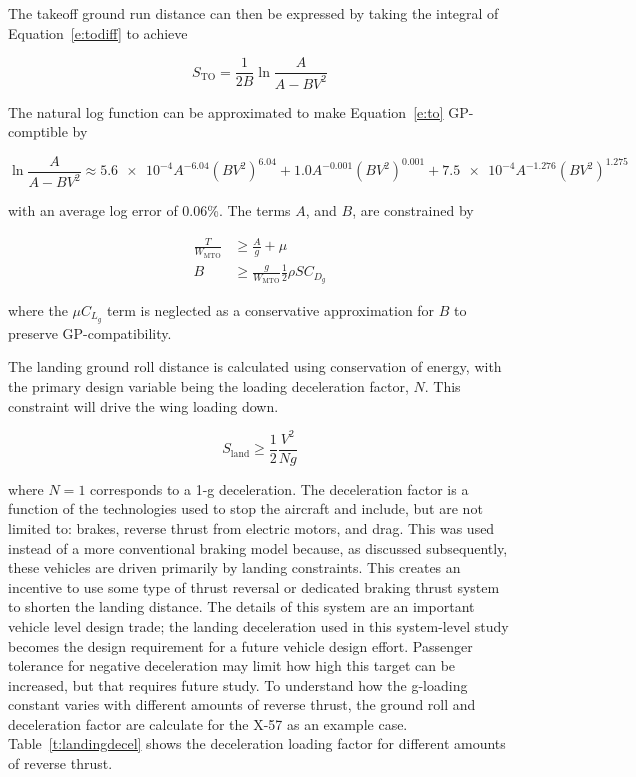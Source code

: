\documentclass[]{aiaa-tc}%
\begin{document}
The takeoff ground run distance can then be expressed by taking the integral of Equation~\ref{e:todiff} to achieve

\begin{equation}
    \label{e:to}
    S_{\mathrm{TO}} = \frac{1}{2B} \ln{\frac{A}{A-BV^2}} 
\end{equation}

The natural log function can be approximated to make Equation~\ref{e:to} GP-comptible by 

\begin{equation}
    \ln{\frac{A}{A-BV^2}} \approx \num{5.6e-4} A^{-6.04} (BV^2)^{6.04} + 1.0 A^{-0.001} (BV^2)^{0.001} + \num{7.5e-4} A^{-1.276} (BV^2)^{1.275}
\end{equation}

with an average log error of 0.06\%.  The terms $A$, and $B$, are constrained by

\begin{align}
    \frac{T}{W_{\mathrm{MTO}}} &\geq \frac{A}{g} + \mu \\
    B &\geq \frac{g}{W_{\mathrm{MTO}}} \frac{1}{2} \rho S C_{D_g}
\end{align}

where the $\mu C_{L_g}$ term is neglected as a conservative approximation for $B$ to preserve GP-compatibility. 

The landing ground roll distance is calculated using conservation of energy, with the primary design variable being the loading deceleration factor, $N$.
This constraint will drive the wing loading down. 

\begin{equation}
    \label{e:sgr}
    S_{\mathrm{land}} \geq \frac{1}{2} \frac{V^2}{Ng} 
\end{equation}

where $N=1$ corresponds to a 1-g deceleration. 
The deceleration factor is a function of the technologies used to stop the aircraft and include, but are not limited to: brakes, reverse thrust from electric motors, and drag.  This was used instead of a more conventional braking model because, as discussed subsequently, these vehicles are driven primarily by landing constraints.  This creates an incentive to use some type of thrust reversal or dedicated braking thrust system to shorten the landing distance.  The details of this system are an important vehicle level design trade; the landing deceleration used in this system-level study becomes the design requirement for a future vehicle design effort. Passenger tolerance for negative deceleration may limit how high this target can be increased, but that requires future study.  
To understand how the g-loading constant varies with different amounts of reverse thrust, the ground roll and deceleration factor are calculate for the X-57 as an example case. 
Table~\ref{t:landingdecel} shows the deceleration loading factor for different amounts of reverse thrust. 
\end{document}
